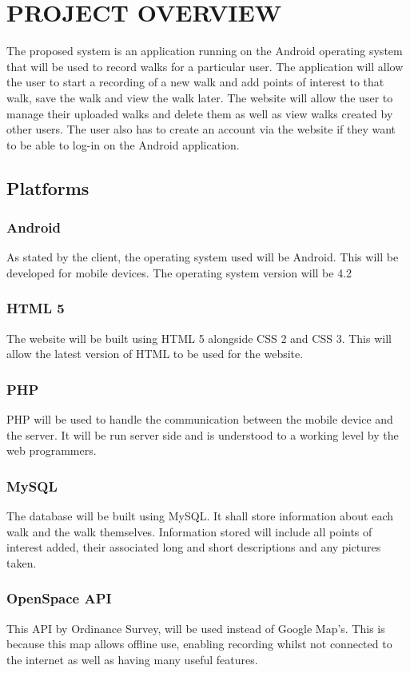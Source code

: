 \documentclass[12pt]{article}
\begin{document}
\section{PROJECT OVERVIEW}
The proposed system is an application running on the Android operating system that will be used to
record walks for a particular user. The application will allow the user to start a recording of a new
walk and add points of interest to that walk, save the walk and view the walk later.
The website will allow the user to manage their uploaded walks and delete them as well as view
walks created by other users. The user also has to create an account via the website if they want to
be able to log-in on the Android application.
\subsection{Platforms}
\subsubsection{Android}
As stated by the client, the operating system used will be Android. This will be developed for
mobile devices. The operating system version will be 4.2
\subsubsection{HTML 5}
The website will be built using HTML 5 alongside CSS 2 and CSS 3. This will allow the latest
version of HTML to be used for the website.
\subsubsection{PHP}
PHP will be used to handle the communication between the mobile device and the server. It
will be run server side and is understood to a working level by the web programmers.
\subsubsection{MySQL}
The database will be built using MySQL. It shall store information about each walk and the
walk themselves. Information stored will include all points of interest added, their
associated long and short descriptions and any pictures taken.
\subsubsection{OpenSpace API}
This API by Ordinance Survey, will be used instead of Google Map’s. This is because this map
allows offline use, enabling recording whilst not connected to the internet as well as having
many useful features.
\end{document}
